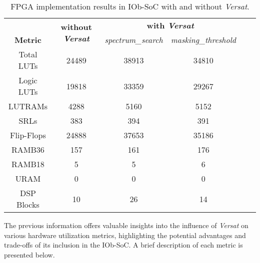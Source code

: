 \begin{table}[H]
    \centering
    \begin{tabular}{c|c|c|c|c|c|}
    \cline{2-4}
    \multicolumn{1}{c|}{}  &  \multirow{2}{*}{\parbox{2.5cm}{\centering \textbf{without \textit{Versat}}}} & \multicolumn{2}{c|}{\textbf{with \textit{Versat}}} \\
    \cline{1-1} \cline{3-4}
    \multicolumn{1}{|c|}{\textbf{Metric}} & & \textit{spectrum\_search} & \textit{masking\_threshold} \\
    \hline
    \multicolumn{1}{|c|}{Total LUTs}  & 24489 &  38913 & 34810\\ 
    \hline
    \multicolumn{1}{|c|}{Logic LUTs}  & 19818 &  33359 & 29267\\ 
    \hline
    \multicolumn{1}{|c|}{LUTRAMs}  & 4288 & 5160 & 5152\\ 
    \hline
    \multicolumn{1}{|c|}{SRLs}  & 383 & 394 & 391\\ 
    \hline
    \multicolumn{1}{|c|}{Flip-Flops}  & 24888 & 37653 &  35186\\ 
    \hline
    \multicolumn{1}{|c|}{RAMB36}  & 157 &  161 &  176\\ 
    \hline
    \multicolumn{1}{|c|}{RAMB18}  & 5 &  5 & 6\\ 
    \hline
    \multicolumn{1}{|c|}{URAM}  & 0 &  0 & 0\\ 
    \hline
    \multicolumn{1}{|c|}{DSP Blocks}  & 10 & 26 & 14\\ 
    \hline
    \end{tabular}
    \caption{FPGA implementation results in IOb-SoC with and without \textit{Versat}.}
    \label{implementation}
\end{table}


The previous information offers valuable insights into the influence of \textit{Versat} on various hardware utilization metrics, highlighting the potential advantages and trade-offs of its inclusion in the IOb-SoC. A brief description of each metric is presented below.

